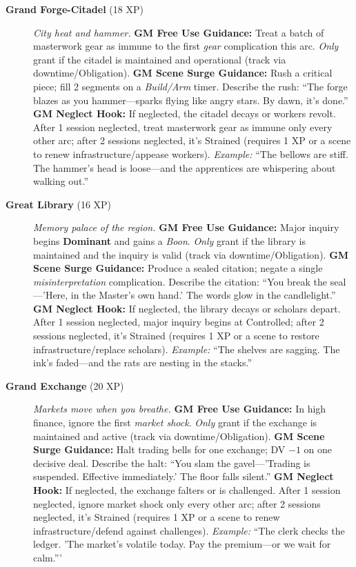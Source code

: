 \begin{description}
  \item[\textbf{Grand Forge-Citadel} (18 XP)]   
        \emph{City heat and hammer.}  
        \textbf{GM Free Use Guidance:} Treat a batch of masterwork gear as immune to the first \emph{gear} complication this arc. \emph{Only} grant if the citadel is maintained and operational (track via downtime/Obligation).  
        \textbf{GM Scene Surge Guidance:} Rush a critical piece; fill 2 segments on a \emph{Build/Arm} timer. Describe the rush: ``The forge blazes as you hammer---sparks flying like angry stars. By dawn, it's done.''  
        \textbf{GM Neglect Hook:} If neglected, the citadel decays or workers revolt. After 1 session neglected, treat masterwork gear as immune only every other arc; after 2 sessions neglected, it's Strained (requires 1 XP or a scene to renew infrastructure/appease workers).  
        \textit{Example:} ``The bellows are stiff. The hammer's head is loose---and the apprentices are whispering about walking out.''  

  \item[\textbf{Great Library} (16 XP)]   
        \emph{Memory palace of the region.}  
        \textbf{GM Free Use Guidance:} Major inquiry begins \textbf{Dominant} and gains a \emph{Boon}. \emph{Only} grant if the library is maintained and the inquiry is valid (track via downtime/Obligation).  
        \textbf{GM Scene Surge Guidance:} Produce a sealed citation; negate a single \emph{misinterpretation} complication. Describe the citation: ``You break the seal---'Here, in the Master's own hand.' The words glow in the candlelight.''  
        \textbf{GM Neglect Hook:} If neglected, the library decays or scholars depart. After 1 session neglected, major inquiry begins at Controlled; after 2 sessions neglected, it's Strained (requires 1 XP or a scene to restore infrastructure/replace scholars).  
        \textit{Example:} ``The shelves are sagging. The ink's faded---and the rats are nesting in the stacks.''  

  \item[\textbf{Grand Exchange} (20 XP)]   
        \emph{Markets move when you breathe.}  
        \textbf{GM Free Use Guidance:} In high finance, ignore the first \emph{market shock}. \emph{Only} grant if the exchange is maintained and active (track via downtime/Obligation).  
        \textbf{GM Scene Surge Guidance:} Halt trading bells for one exchange; DV $-1$ on one decisive deal. Describe the halt: ``You slam the gavel---'Trading is suspended. Effective immediately.' The floor falls silent.''  
        \textbf{GM Neglect Hook:} If neglected, the exchange falters or is challenged. After 1 session neglected, ignore market shock only every other arc; after 2 sessions neglected, it's Strained (requires 1 XP or a scene to renew infrastructure/defend against challenges).  
        \textit{Example:} ``The clerk checks the ledger. 'The market's volatile today. Pay the premium---or we wait for calm.'''  


\end{description}
